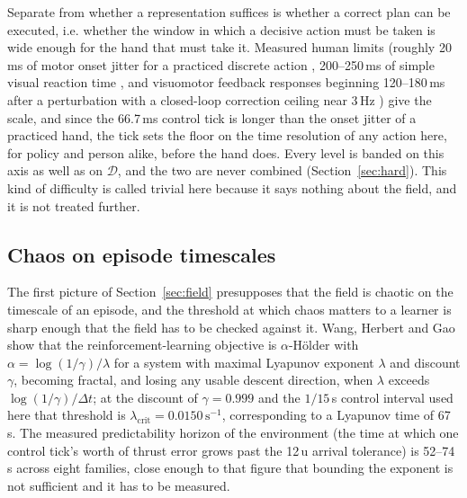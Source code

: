 \documentclass[11pt]{article}
\newcommand{\dd}{\mathcal{D}}
\begin{document}
Separate from whether a representation suffices is whether a correct plan
can be executed, i.e. whether the window in which a decisive action must be
taken is wide enough for the hand that must take it. Measured human limits
(roughly 20\,ms of motor onset jitter for a practiced discrete action
\cite{repp2005}, 200--250\,ms of simple visual reaction time
\cite{woods2015}, and visuomotor feedback responses beginning 120--180\,ms
after a perturbation with a closed-loop correction ceiling near 3\,Hz
\cite{franklin2011,franklin2014}) give the scale, and since the 66.7\,ms control tick is longer than the
onset jitter of a practiced hand, the tick sets the floor on the time
resolution of any action here, for policy and person alike, before the hand
does.
Every level is banded on this axis as well as on $\dd$, and the two are
never combined (Section~\ref{sec:hard}). This kind of difficulty is called
trivial here because it says nothing about the field, and it is not treated
further.

\subsection{Chaos on episode timescales}
\label{sec:chaos}

The first picture of Section~\ref{sec:field} presupposes that the
field is chaotic on the timescale of an episode, and the threshold at which
chaos matters to a learner is sharp enough that the field has to be checked
against it. Wang, Herbert and Gao \cite{wang2023} show that the
reinforcement-learning objective is $\alpha$-H\"older with
$\alpha = \log(1/\gamma)/\lambda$ for a system with maximal Lyapunov
exponent $\lambda$ and discount $\gamma$, becoming fractal, and losing any
usable descent direction, when $\lambda$ exceeds $\log(1/\gamma)/\Delta t$;
at the discount of $\gamma = 0.999$ and the $1/15$\,s control interval used
here that threshold is $\lambda_{\mathrm{crit}} = 0.0150\,\mathrm{s}^{-1}$,
corresponding to a Lyapunov time of 67\,s. The measured predictability
horizon of the environment (the time at which one control tick's worth of
thrust error grows past the 12\,u arrival tolerance) is 52--74\,s across
eight families, close enough to that figure that bounding the exponent is
not sufficient and it has to be measured.
\end{document}
